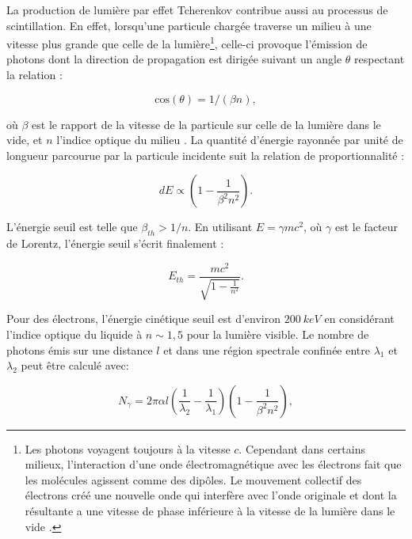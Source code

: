 La production de lumière par effet Tcherenkov contribue aussi au processus de scintillation. En effet, lorsqu'une particule chargée traverse un milieu à une vitesse plus grande que celle de la lumière\footnote{Les photons voyagent toujours à la vitesse $c$. Cependant dans certains milieux, l'interaction d'une onde électromagnétique avec les électrons fait que les molécules agissent comme des dipôles. Le mouvement collectif des électrons créé une nouvelle onde qui interfère avec l'onde originale et dont la résultante a une vitesse de phase inférieure à la vitesse de la lumière dans le vide \cite{doi:10.1119/1.12596}.}, celle-ci provoque l'émission de photons dont la direction de propagation est dirigée suivant un angle $\theta$ respectant la relation : 

\begin{equation} 
\textrm{cos}(\theta ) = 1 / (\beta n),
\end{equation} 

\bigbreak 

où $\beta$ est le rapport de la vitesse de la particule sur celle de la lumière dans le vide, et $n$ l'indice optique du milieu \cite{Cerenkov:1937vh}. La quantité d'énergie rayonnée par unité de longueur parcourue par la particule incidente suit la relation de proportionnalité \cite{Frank:1937fk} : 

\begin{equation} 
dE \propto \left(1 - \frac{1}{\beta^2n^2} \right).
\end{equation} 

\bigbreak 

L'énergie seuil est telle que $\beta_{th} > 1/n$. En utilisant $E = \gamma mc^2$, où $\gamma$ est le facteur de Lorentz, l'énergie seuil s'écrit finalement : 

\begin{equation} 
E_{th} = \frac{mc^2}{\sqrt{1 - \frac{1}{n^2}}}.
\end{equation} 

Pour des électrons, l'énergie cinétique seuil est d'environ $\SI{200}{keV}$ en considérant l'indice optique du liquide à $n \sim 1,5$ pour la lumière visible. Le nombre de photons émis sur une distance $l$ et dans une région spectrale confinée entre $\lambda_1$ et $\lambda_2$ peut être calculé avec: 

\begin{equation} 
N_\gamma = 2\pi \alpha l \left(\frac{1}{\lambda_2} - \frac{1}{\lambda_1} \right) \left( 1 - \frac{1}{\beta^2n^2} \right),
\end{equation} 

